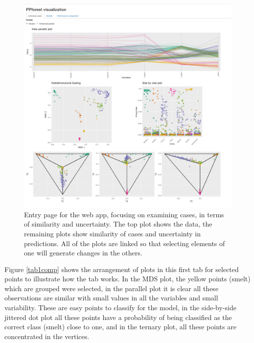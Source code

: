 \documentclass[smallextended,natbib]{svjour3}\usepackage[]{graphicx}\usepackage[]{xcolor}
\begin{document}
\begin{figure}[hbpt]
\centering
\includegraphics[width=1\linewidth]{fish11.png}
\caption{Entry page for the web app, focusing on examining cases, in terms of similarity and uncertainty. The top plot shows the data, the remaining plots show similarity of cases and uncertainty in predictions. All of the plots are linked so that selecting elements of one will generate changes in the others. \label{tab1}}
\end{figure}

Figure \ref{tab1comp} shows the arrangement of plots in this first tab for selected points to illustrate how the tab works. In the MDS plot, the yellow points (smelt) which are grouped were selected, in the parallel plot it is clear all these observations are similar with small values in all the variables and small variability. These are easy points to classify for the model, in the side-by-side jittered dot plot all these points have a   probability of being classified as the correct class (smelt) close to one, and in the ternary plot, all these points are concentrated in the vertices.
\end{document}
